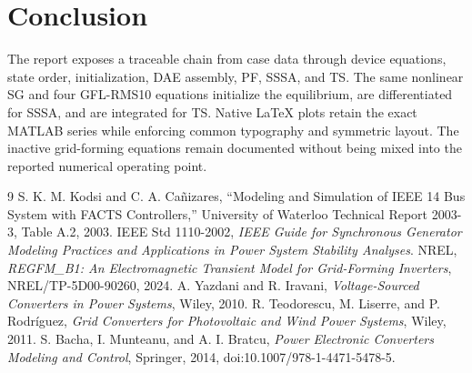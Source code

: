 \documentclass[12pt,a4paper]{article}
\begin{document}
\section{Conclusion}

The report exposes a traceable chain from case data through device equations,
state order, initialization, DAE assembly, PF, SSSA, and TS.  The same
nonlinear SG and four GFL-RMS10 equations initialize the equilibrium, are
differentiated for SSSA, and are integrated for TS.  Native \LaTeX{} plots
retain the exact MATLAB series while enforcing common typography and symmetric
layout.  The inactive grid-forming equations remain documented without being
mixed into the reported numerical operating point.

\begin{thebibliography}{9}
 S. K. M. Kodsi and C. A. Ca\~nizares,
``Modeling and Simulation of IEEE 14 Bus System with FACTS Controllers,''
University of Waterloo Technical Report 2003-3, Table A.2, 2003.
 IEEE Std 1110-2002, \emph{IEEE Guide for Synchronous
Generator Modeling Practices and Applications in Power System Stability Analyses}.
 NREL, \emph{REGFM\_B1: An Electromagnetic Transient Model
for Grid-Forming Inverters}, NREL/TP-5D00-90260, 2024.
 A. Yazdani and R. Iravani, \emph{Voltage-Sourced Converters
in Power Systems}, Wiley, 2010.
 R. Teodorescu, M. Liserre, and P. Rodr\'iguez,
\emph{Grid Converters for Photovoltaic and Wind Power Systems}, Wiley, 2011.
 S. Bacha, I. Munteanu, and A. I. Bratcu,
\emph{Power Electronic Converters Modeling and Control}, Springer, 2014,
doi:10.1007/978-1-4471-5478-5.
\end{thebibliography}
\end{document}
